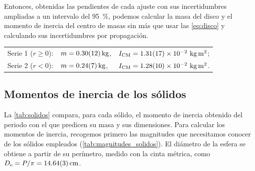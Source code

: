 \documentclass[a4paper,11pt]{amsart}
\numberwithin{equation}{section}
\newcommand{\Icm}{I_{\mathrm{CM}}}            %
\theoremstyle{cienplano}
\theoremstyle{ciendef}
\theoremstyle{cienobs}
\begin{document}
Entonces, obtenidas las pendientes de cada ajuste con sus incertidumbres
ampliadas a un intervalo del \SI{95}{\percent}, podemos calcular la masa del
disco y el momento de inercia del centro de masas sin más que usar las
\cref{eq:disco} y calculando sus incertidumbres por propagación.
\begin{destacado}
\vspace{6pt}\noindent
\begin{tabular}{@{}l l l@{}}
Serie 1 ($r\ge0$): & $m=\SI{0,30 \pm 0,12}{\kilogram}$, &
  $\Icm=\num{1,31 \pm 0,17 e-2}\ \si{\kilogram\meter\squared}$; \\[2pt]
Serie 2 ($r<0$): & $m=\SI{0,24 \pm 0,07}{\kilogram}$, &
  $\Icm=\num{1,28 \pm 0,10 e-2}\ \si{\kilogram\meter\squared}$.
\end{tabular}
\end{destacado}

\subsection{Momentos de inercia de los sólidos}\label{sec:resSolidos}
La \cref{tab:solidos} compara, para cada sólido, el momento de inercia
obtenido del periodo con el que predicen su masa y sus dimensiones. Para
calcular los momentos de inercia, recogemos primero las magnitudes que
necesitamos conocer de los sólidos empleados (\cref{tab:magnitudes_solidos}).
El diámetro de la esfera se obtiene a partir de su perímetro, medido con la
cinta métrica, como $D_{\mathrm{e}}=P/\pi=\SI{14,64 \pm 0,03}{\centi\meter}$.
\end{document}
